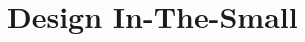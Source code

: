 \documentclass[../DD.tex]{subfiles}
\begin{document}
\chapter{Design In-The-Small}
\thispagestyle{fancy}
	
	
	
	
	
\end{document}
